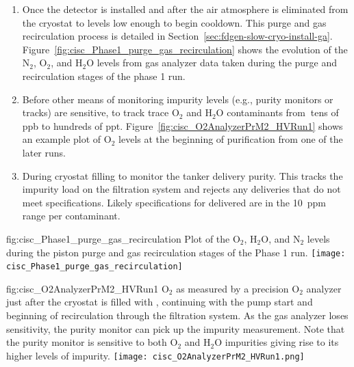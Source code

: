 \begin{enumerate}
\item Once the detector is installed and after the air atmosphere is eliminated from the cryostat to levels low enough to begin cooldown. This purge and gas recirculation process is detailed in Section~\ref{sec:fdgen-slow-cryo-install-ga}. Figure~\ref{fig:cisc_Phase1_purge_gas_recirculation} shows the evolution of the $\text{N}_2$, $\text{O}_2$, and $\text{H}_2\text{O}$ levels from gas analyzer data taken during the purge and recirculation stages of the   %
phase 1 run.


\item Before other means of monitoring impurity levels (e.g., purity monitors or  tracks) are sensitive, to track trace $\text{O}_2$ and $\text{H}_2\text{O}$ contaminants from $\>$tens of ppb to hundreds of ppt.  Figure~\ref{fig:cisc_O2AnalyzerPrM2_HVRun1} shows an example plot of $\text{O}_2$ levels at the beginning of \lar purification from one of the later   runs.

\item During cryostat filling to monitor the tanker \lar delivery purity. This tracks the impurity load on the filtration system and rejects any deliveries that do not meet specifications. Likely specifications for delivered \lar are in the \SI{10}{ppm} range per contaminant.


\end{enumerate}

\begin{dunefigure}{fig:cisc_Phase1_purge_gas_recirculation}
  {Plot of the $\text{O}_2$, $\text{H}_2\text{O}$, and $\text{N}_2$ levels during the piston purge and gas recirculation stages of the  Phase 1 run.}
  \texttt{[image: cisc\_Phase1\_purge\_gas\_recirculation]}
\end{dunefigure}

\begin{dunefigure}{fig:cisc_O2AnalyzerPrM2_HVRun1}
  {$\text{O}_2$ as measured by a precision $\text{O}_2$ analyzer just after the  cryostat is filled with \lar, continuing with the \lar pump start and beginning of \lar recirculation through the filtration system. As the gas analyzer loses sensitivity, the purity monitor can pick up the impurity measurement. Note that the purity monitor is sensitive to both $\text{O}_2$ and $\text{H}_2\text{O}$ impurities giving rise to its higher levels of impurity.}
  \texttt{[image: cisc\_O2AnalyzerPrM2\_HVRun1.png]}
\end{dunefigure}

